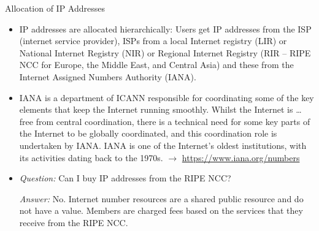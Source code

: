 \documentclass{beamer}
\begin{document}
\begin{frame}{Allocation of IP Addresses}\small
\begin{itemize}
\item IP addresses are allocated hierarchically: Users get IP addresses from
  the ISP (internet service provider), ISPs from a local Internet registry
  (LIR) or National Internet Registry (NIR) or Regional Internet Registry (RIR
  -- RIPE NCC for Europe, the Middle East, and Central Asia) and these from
  the Internet Assigned Numbers Authority (IANA).
\item IANA is a department of ICANN responsible for coordinating some of the
  key elements that keep the Internet running smoothly. Whilst the Internet is
  … free from central coordination, there is a technical need for some key
  parts of the Internet to be globally coordinated, and this coordination role
  is undertaken by IANA. IANA is one of the Internet's oldest institutions,
  with its activities dating back to the 1970s. $\to$
  \url{https://www.iana.org/numbers}
\item \emph{Question:} Can I buy IP addresses from the RIPE NCC? 

  \emph{Answer:} No. Internet number resources are a shared public resource
  and do not have a value. Members are charged fees based on the services that
  they receive from the RIPE NCC.
\end{itemize}
\end{frame}
\end{document}
